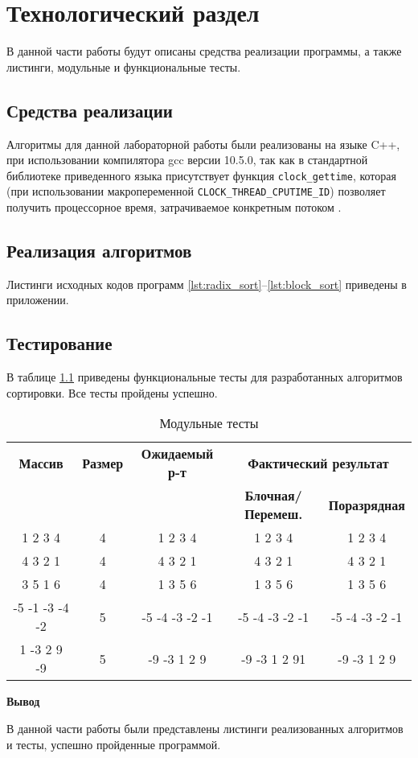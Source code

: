 \chapter{Технологический раздел}

В данной части работы будут описаны средства реализации программы, а также листинги, модульные и функциональные тесты.

\section{Средства реализации}
Алгоритмы для данной лабораторной работы были реализованы на языке C++, при использовании компилятора gcc версии 10.5.0, так как в стандартной библиотеке приведенного языка
присутствует функция \texttt{clock\_gettime}, которая (при использовании макропеременной \texttt{CLOCK\_THREAD\_CPUTIME\_ID}) позволяет получить процессорное время, затрачиваемое конкретным потоком \cite{cpp-time}.



\section{Реализация алгоритмов}
Листинги исходных кодов программ  \ref{lst:radix_sort}--\ref{lst:block_sort} приведены в приложении.


\section{Тестирование}

В таблице \ref{t:mod_tests} приведены функциональные тесты для разработанных алгоритмов сортировки. Все тесты пройдены успешно.
\begin{table}[ht]
	\small
	\begin{center}
		\begin{threeparttable}
			\caption{Модульные тесты}
			\label{t:mod_tests}
			\begin{tabular}{|c|c|c|c|c|}
				\hline
				\bfseries Массив
				& \bfseries Размер
				& \bfseries Ожидаемый р-т
				& \multicolumn{2}{c|}{\bfseries Фактический результат} \\ \cline{4-5}
				& & & \bfseries Блочная/Перемеш. & \bfseries Поразрядная \\
				\hline
				1 2 3 4  & 4 & 1 2 3 4 & 1 2 3 4 & 1 2 3 4 \\
				\hline
				4 3 2 1 & 4 & 4 3 2 1 & 4 3 2 1 & 4 3 2 1 \\
				\hline
				3 5 1 6 & 4 & 1 3 5 6  & 1 3 5 6 & 1 3 5 6 \\
				\hline
				-5 -1 -3 -4 -2 & 5 & -5 -4 -3 -2 -1 & -5 -4 -3 -2 -1 & -5 -4 -3 -2 -1 \\
				\hline
				1 -3 2 9 -9 & 5 & -9 -3 1 2 9  & -9 -3 1 2 91 & -9 -3 1 2 9 \\
				\hline
			\end{tabular}	
		\end{threeparttable}	
	\end{center}
\end{table}

\textbf{Вывод}

В данной части работы были представлены листинги реализованных алгоритмов и тесты, успешно пройденные программой.